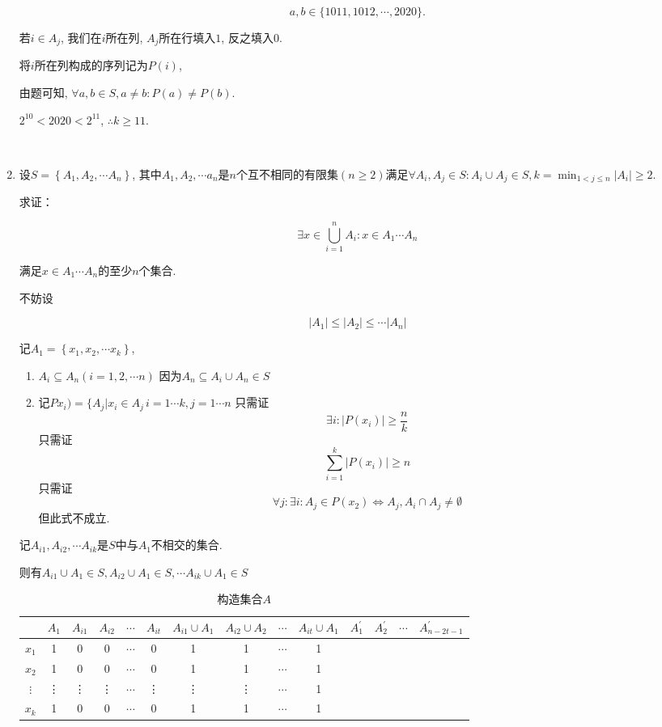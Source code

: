 \documentclass[8pt]{article}
\begin{document}
\begin{enumerate}
			$$a,b \in \{1011, 1012, \cdots, 2020\}.$$

			若$i\in A_j$, 我们在$i$所在列, $A_j$所在行填入$1$, 反之填入$0$.

			将$i$所在列构成的序列记为$P(i)$,

			由题可知, $\forall a, b \in S, a \neq b : P(a) \neq P(b)$.

			$2^{10} < 2020 < 2^{11}$, $\therefore k\geq 11$.

		~\\

		\item

			设$S=\left \{ A_1, A_2, \cdots A_n \right \}$, 其中$A_1, A_2, \cdots a_n$是$n$个互不相同的有限集$(n \geq 2)$满足$\forall A_i, A_j \in S : A_i \cup A_j \in S, k = \min_{1<j\leq n}\left|A_i\right|\geq 2$.

			求证：

			$$\exists x \in \bigcup_{i=1}^{n} A_i : x \in A_1 \cdots A_n$$

			满足$x \in A_1 \cdots A_n$的至少$n$个集合.

			不妨设

			$$\left| A_1 \right| \leq \left| A_2 \right| \leq \cdots \left| A_n \right|$$

			记$A_1=\left \{ x_1, x_2, \cdots x_k \right \}$,

			\begin{enumerate} [ (i) ]
				\item
					$A_i \subseteq A_n (i = 1, 2, \cdots n)$
					因为$A_n \subseteq A_i \cup A_n \in S$ 
				
				\item
					记$P{x_i)=\{A_j|x_i \in A_j\, i = 1 \cdots k, j = 1 \cdots n}$
					只需证
					$$\exists i: \left|P(x_i)\right| \geq \frac{n}{k}$$
					只需证
					$$\sum_{i=1}^k \left|P(x_i)\right| \geq n$$
					只需证
					$$\forall j:\exists i: A_j \in P(x_2) \Leftrightarrow A_j, A_i \cap A_j \neq \emptyset$$
					但此式不成立.
			\end{enumerate}

			记$A_{i1}, A_{i2}, \cdots A_{ik}$是$S$中与$A_1$不相交的集合.

			则有$A_{i1}\cup A_1 \in S, A_{i2}\cup A_1 \in S, \cdots A_{ik}\cup A_1 \in S$

			\begin{table}[h]
				\centering
				\begin{tabular}{|c|c|c|c|c|c|c|c|c|c|c|c|c|c|}
					\hline &$A_1$&$A_{i1}$&$A_{i2}$&$\cdots$&$A_{it}$&$A_{i1}\cup A_1$&$A_{i2}\cup A_2$&$\cdots$&$A_{it}\cup A_1$&$A_1^{'}$&$A_2^{'}$&$\cdots$&$A_{n-2t-1}^{'}$\\
					\hline $x_1$&1&0&0&$\cdots$&0&1&1&$\cdots$&1&&&&\\
					\hline $x_2$&1&0&0&$\cdots$&0&1&1&$\cdots$&1&&&&\\
					\hline $\vdots$&\vdots&\vdots&\vdots&$\cdots$&\vdots&\vdots&\vdots&$\cdots$&1&&&&\\
					\hline $x_k$&1&0&0&$\cdots$&0&1&1&$\cdots$&1&&&&\\
					\hline
				\end{tabular}
				\caption{构造集合$A$}
			\end{table}


\end{enumerate}
\end{document}
